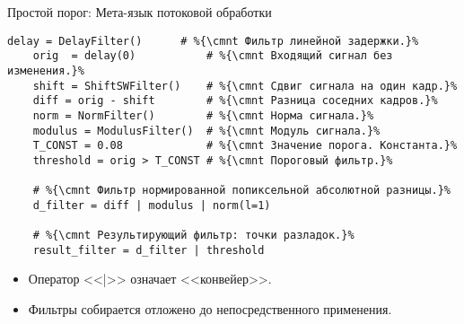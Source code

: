 \begin{frame}[fragile]{Простой порог: Мета-язык потоковой обработки}
    \begin{lstlisting}[language=FilterPython]
    delay = DelayFilter()      # %{\cmnt Фильтр линейной задержки.}%
    orig  = delay(0)           # %{\cmnt Входящий сигнал без изменения.}%
    shift = ShiftSWFilter()    # %{\cmnt Сдвиг сигнала на один кадр.}%
    diff = orig - shift        # %{\cmnt Разница соседних кадров.}%
    norm = NormFilter()        # %{\cmnt Норма сигнала.}%
    modulus = ModulusFilter()  # %{\cmnt Модуль сигнала.}%
    T_CONST = 0.08             # %{\cmnt Значение порога. Константа.}%
    threshold = orig > T_CONST # %{\cmnt Пороговый фильтр.}%
    
    # %{\cmnt Фильтр нормированной попиксельной абсолютной разницы.}%
    d_filter = diff | modulus | norm(l=1)
    
    # %{\cmnt Результирующий фильтр: точки разладок.}%
    result_filter = d_filter | threshold
    \end{lstlisting}
    \begin{itemize}
        \item Оператор <<|>> означает <<конвейер>>.
        \item Фильтры собирается отложено 
                до непосредственного применения.
    \end{itemize}

\end{frame}

